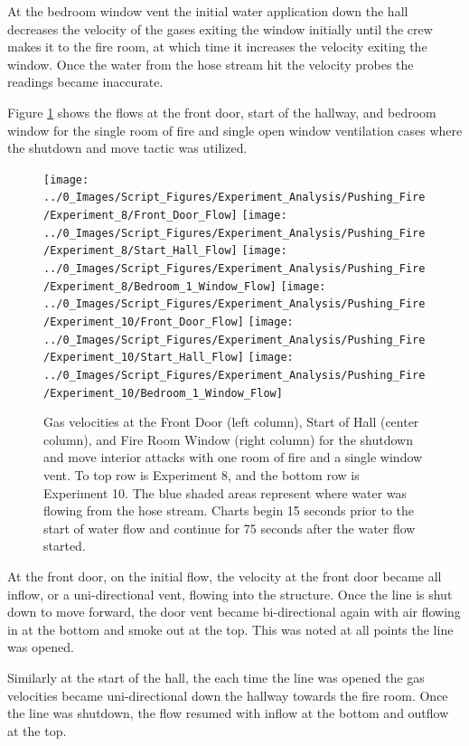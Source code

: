 \documentclass[12pt,oneside]{book}
\begin{document}
At the bedroom window vent the initial water application down the hall decreases the velocity of the gases exiting the window initially until the crew makes it to the fire room, at which time it increases the velocity exiting the window. Once the water from the hose stream hit the velocity probes the readings became inaccurate. 

Figure \ref{fig:push_fire_interior_shut_move} shows the flows at the front door, start of the hallway, and bedroom window for the single room of fire and single open window ventilation cases where the shutdown and move tactic was utilized. 

\begin{figure}[H]
\centering
\texttt{[image: ../0\_Images/Script\_Figures/Experiment\_Analysis/Pushing\_Fire/Experiment\_8/Front\_Door\_Flow]}
\texttt{[image: ../0\_Images/Script\_Figures/Experiment\_Analysis/Pushing\_Fire/Experiment\_8/Start\_Hall\_Flow]}
\texttt{[image: ../0\_Images/Script\_Figures/Experiment\_Analysis/Pushing\_Fire/Experiment\_8/Bedroom\_1\_Window\_Flow]}
\texttt{[image: ../0\_Images/Script\_Figures/Experiment\_Analysis/Pushing\_Fire/Experiment\_10/Front\_Door\_Flow]}
\texttt{[image: ../0\_Images/Script\_Figures/Experiment\_Analysis/Pushing\_Fire/Experiment\_10/Start\_Hall\_Flow]}
\texttt{[image: ../0\_Images/Script\_Figures/Experiment\_Analysis/Pushing\_Fire/Experiment\_10/Bedroom\_1\_Window\_Flow]}
\caption[Gas Velocities - Single Room of Fire - Interior - Shutdown and Move]{Gas velocities at the Front Door (left column), Start of Hall (center column), and Fire Room Window (right column) for the shutdown and move interior attacks with one room of fire and a single window vent. To top row is Experiment 8, and the bottom row is Experiment 10. The blue shaded areas represent where water was flowing from the hose stream. Charts begin 15 seconds prior to the start of water flow and continue for 75 seconds after the water flow started.}
\label{fig:push_fire_interior_shut_move}
\end{figure}

At the front door, on the initial flow, the velocity at the front door became all inflow, or a uni-directional vent, flowing into the structure. Once the line is shut down to move forward, the door vent became bi-directional again with air flowing in at the bottom and smoke out at the top. This was noted at all points the line was opened. 

Similarly at the start of the hall, the each time the line was opened the gas velocities became uni-directional down the hallway towards the fire room. Once the line was shutdown, the flow resumed with inflow at the bottom and outflow at the top.
\end{document}
